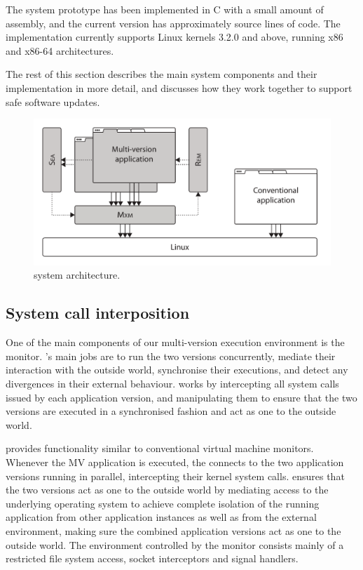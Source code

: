 The system prototype has been implemented in C with a small amount of
assembly, and the current version has approximately \mxSLOC source
lines of code. The implementation currently supports Linux kernels
3.2.0 and above, running x86 and x86-64 architectures.

The rest of this section describes the main \mx system components and
their implementation in more detail, and discusses how they work
together to support safe software updates.

\begin{figure}[t!]
\begin{center}
\includegraphics[width=0.6\columnwidth]{safe-updates/figures/architecture}
\caption{\mx system architecture.  
}
\label{fig:design}
\end{center}
\end{figure}


\subsection{System call interposition}
\label{sec:mxm}

One of the main components of our multi-version execution environment
is the \mxm monitor.  \mxm's main jobs are to run the two versions
concurrently, mediate their interaction with the outside world,
synchronise their executions, and detect any divergences in their
external behaviour. \mxm works by intercepting all system calls issued
by each application version, and manipulating them to ensure that the
two versions are executed in a synchronised fashion and act as one to
the outside world.

\mxm provides functionality similar to conventional virtual machine monitors.
Whenever the MV application is executed, the \mxm connects to the two
application versions running in parallel, intercepting their kernel system
calls.  \mxm ensures that the two versions act as one to the outside world by
mediating access to the underlying operating system to achieve complete
isolation of the running application from other application instances as well
as from the external environment, making sure the combined application versions
act as one to the outside world.  The environment controlled by the monitor
consists mainly of a restricted file system access, socket interceptors and
signal handlers.

